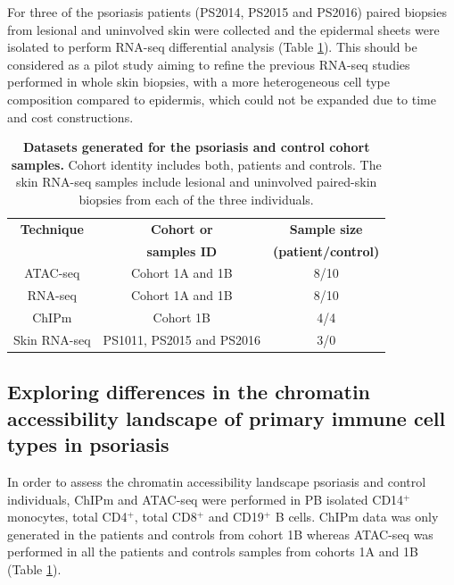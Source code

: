 For three of the psoriasis patients (PS2014, PS2015 and PS2016) paired biopsies from lesional and uninvolved skin were collected and the epidermal sheets were isolated to perform RNA-seq differential analysis (Table \ref{tab:Psoriasis_controls_datasets_per_sample}). This should be considered as a pilot study aiming to refine the previous RNA-seq studies performed in whole skin biopsies, with a more heterogeneous cell type composition compared to epidermis, which could not be expanded due to time and cost constructions.



\begin{table}[htbp]
\centering
\begin{tabular}{@{} c c c}
\toprule
\textbf{Technique} & \textbf{Cohort or}  & \textbf{Sample size}      \\
                   & \textbf{samples ID} & \textbf{(patient/control)} \\
\midrule
\midrule
ATAC-seq      & Cohort 1A and 1B &  8/10 \\
RNA-seq       & Cohort 1A and 1B &  8/10 \\
ChIPm         & Cohort 1B        &  4/4   \\
Skin RNA-seq  & PS1011, PS2015 and PS2016 & 3/0\\
\bottomrule
\end{tabular}
\medskip %
\caption[Datasets generated for the psoriasis and control cohort samples.]{\textbf{Datasets generated for the psoriasis and control cohort samples.} Cohort identity includes both, patients and controls. The skin RNA-seq samples include lesional and uninvolved paired-skin biopsies from each of the three individuals.}
\label{tab:Psoriasis_controls_datasets_per_sample}
\end{table}
\bigskip %



\subsection{Exploring differences in the chromatin accessibility landscape of primary immune cell types in psoriasis}

In order to assess the chromatin accessibility landscape  psoriasis and control individuals, ChIPm and ATAC-seq were performed in PB isolated CD14$^+$ monocytes, total CD4$^+$, total CD8$^+$ and CD19$^+$ B cells. ChIPm data was only generated in the patients and controls from cohort 1B whereas ATAC-seq was performed in all the patients and controls samples from cohorts 1A and 1B (Table \ref{tab:Psoriasis_controls_datasets_per_sample}).


